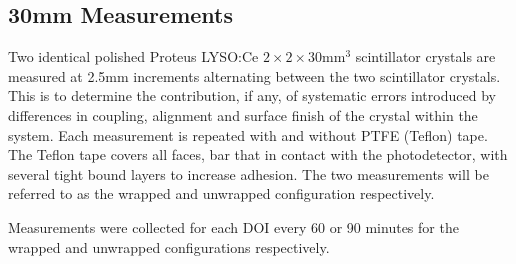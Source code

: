\subsection{30mm Measurements}
Two identical polished Proteus LYSO:Ce $2\times2\times30$mm$^3$ scintillator crystals are measured at 2.5mm increments alternating between the two scintillator crystals. This is to determine the contribution, if any, of systematic errors introduced by differences in coupling, alignment and surface finish of the crystal within the system. Each measurement is repeated with and without PTFE (Teflon) tape. The Teflon tape covers all faces, bar that in contact with the photodetector, with several tight bound layers to increase adhesion. The two measurements will be referred to as the wrapped and unwrapped configuration respectively.

Measurements were collected for each DOI every 60 or 90 minutes for the wrapped and unwrapped configurations respectively. 

